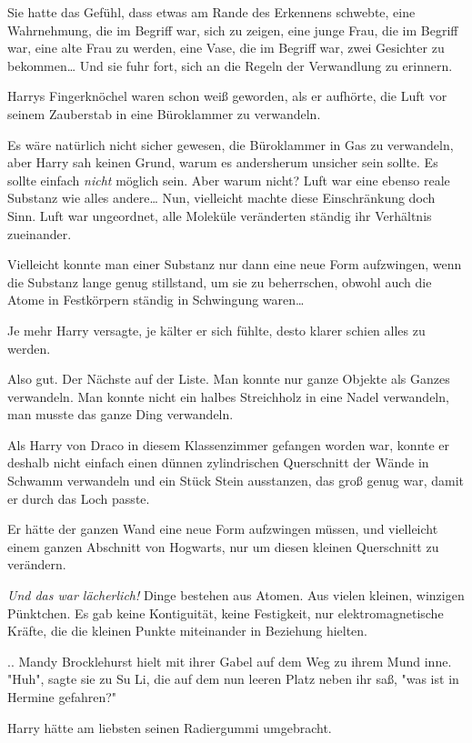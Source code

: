 {Sie hatte das Gefühl, dass etwas am Rande des Erkennens schwebte, eine Wahrnehmung, die im Begriff war, sich zu zeigen, eine junge Frau, die im Begriff war, eine alte Frau zu werden, eine Vase, die im Begriff war, zwei Gesichter zu bekommen… Und sie fuhr fort, sich an die Regeln der Verwandlung zu erinnern.

Harrys Fingerknöchel waren schon weiß geworden, als er aufhörte, die Luft vor seinem Zauberstab in eine Büroklammer zu verwandeln.

Es wäre natürlich nicht sicher gewesen, die Büroklammer in Gas zu verwandeln, aber Harry sah keinen Grund, warum es andersherum unsicher sein sollte. Es sollte einfach \emph{nicht} möglich sein. Aber warum nicht? Luft war eine ebenso reale Substanz wie alles andere… Nun, vielleicht machte diese Einschränkung doch Sinn. Luft war ungeordnet, alle Moleküle veränderten ständig ihr Verhältnis zueinander.

Vielleicht konnte man einer Substanz nur dann eine neue Form aufzwingen, wenn die Substanz lange genug stillstand, um sie zu beherrschen, obwohl auch die Atome in Festkörpern ständig in Schwingung waren…

Je mehr Harry versagte, je kälter er sich fühlte, desto klarer schien alles zu werden.

Also gut. Der Nächste auf der Liste. Man konnte nur ganze Objekte als Ganzes verwandeln. Man konnte nicht ein halbes Streichholz in eine Nadel verwandeln, man musste das ganze Ding verwandeln.

Als Harry von Draco in diesem Klassenzimmer gefangen worden war, konnte er deshalb nicht einfach einen dünnen zylindrischen Querschnitt der Wände in Schwamm verwandeln und ein Stück Stein ausstanzen, das groß genug war, damit er durch das Loch passte.

Er hätte der ganzen Wand eine neue Form aufzwingen müssen, und vielleicht einem ganzen Abschnitt von Hogwarts, nur um diesen kleinen Querschnitt zu verändern.

\emph{Und das war lächerlich!} Dinge bestehen aus Atomen. Aus vielen kleinen, winzigen Pünktchen. Es gab keine Kontiguität, keine Festigkeit, nur elektromagnetische Kräfte, die die kleinen Punkte miteinander in Beziehung hielten.

.. Mandy Brocklehurst hielt mit ihrer Gabel auf dem Weg zu ihrem Mund inne. "Huh", sagte sie zu Su Li, die auf dem nun leeren Platz neben ihr saß, "was ist in Hermine gefahren?"

Harry hätte am liebsten seinen Radiergummi umgebracht.

}
